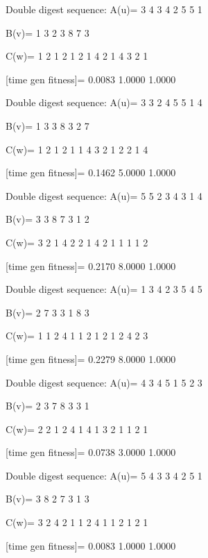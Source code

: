 Double digest sequence:
A(u)=
     3     4     3     4     2     5     5     1

B(v)=
     1     3     2     3     8     7     3

C(w)=
     1     2     1     2     1     2     1     4     2     1     4     3     2     1

[time gen fitness]=
    0.0083    1.0000    1.0000

Double digest sequence:
A(u)=
     3     3     2     4     5     5     1     4

B(v)=
     1     3     3     8     3     2     7

C(w)=
     1     2     1     2     1     1     4     3     2     1     2     2     1     4

[time gen fitness]=
    0.1462    5.0000    1.0000

Double digest sequence:
A(u)=
     5     5     2     3     4     3     1     4

B(v)=
     3     3     8     7     3     1     2

C(w)=
     3     2     1     4     2     2     1     4     2     1     1     1     1     2

[time gen fitness]=
    0.2170    8.0000    1.0000

Double digest sequence:
A(u)=
     1     3     4     2     3     5     4     5

B(v)=
     2     7     3     3     1     8     3

C(w)=
     1     1     2     4     1     1     2     1     2     1     2     4     2     3

[time gen fitness]=
    0.2279    8.0000    1.0000

Double digest sequence:
A(u)=
     4     3     4     5     1     5     2     3

B(v)=
     2     3     7     8     3     3     1

C(w)=
     2     2     1     2     4     1     4     1     3     2     1     1     2     1

[time gen fitness]=
    0.0738    3.0000    1.0000

Double digest sequence:
A(u)=
     5     4     3     3     4     2     5     1

B(v)=
     3     8     2     7     3     1     3

C(w)=
     3     2     4     2     1     1     2     4     1     1     2     1     2     1

[time gen fitness]=
    0.0083    1.0000    1.0000

